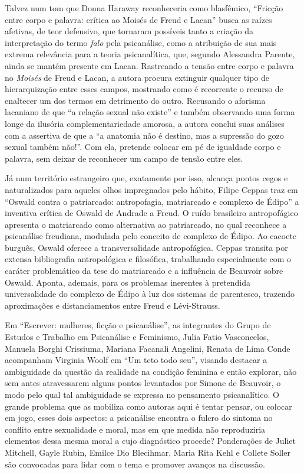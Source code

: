 Talvez num tom que Donna Haraway reconheceria como blasfêmico, ``Fricção
entre corpo e palavra: crítica ao Moisés de Freud e Lacan'' busca as
raízes afetivas, de teor defensivo, que tornaram possíveis tanto a
criação da interpretação do termo \emph{falo} pela psicanálise, como a
atribuição de sua mais extrema relevância para a teoria psicanalítica,
que, segundo Alessandra Parente, ainda se mantém presente em Lacan.
Rastreando a tensão entre corpo e palavra no \emph{Moisés} de Freud e
Lacan, a autora procura extinguir qualquer tipo de hierarquização entre
esses campos, mostrando como é recorrente o recurso de enaltecer um dos
termos em detrimento do outro. Recusando o aforisma lacaniano de que ``a
relação sexual não existe'' e também observando uma forma longe da
ilusória complementariedade amorosa, a autora conclui suas análises com
a assertiva de que a ``a anatomia não é destino, mas a supressão do gozo
sexual também não!''. Com ela, pretende colocar em pé de igualdade corpo
e palavra, sem deixar de reconhecer um campo de tensão entre eles.

Já num território estrangeiro que, exatamente por isso, alcança pontos
cegos e naturalizados para aqueles olhos impregnados pelo hábito, Filipe
Ceppas traz em ``Oswald contra o patriarcado: antropofagia, matriarcado
e complexo de Édipo'' a inventiva crítica de Oswald de Andrade a Freud.
O ruído brasileiro antropofágico apresenta o matriarcado como
alternativa ao patriarcado, no qual reconhece a psicanálise freudiana,
modulada pelo conceito de complexo de Édipo. Ao cacoete burguês, Oswald
oferece a transversalidade antropofágica. Ceppas transita por extensa
bibliografia antropológica e filosófica, trabalhando especialmente com o
caráter problemático da tese do matriarcado e a influência de Beauvoir
sobre Oswald. Aponta, ademais, para os problemas inerentes à pretendida
universalidade do complexo de Édipo à luz dos sistemas de parentesco,
trazendo aproximações e distanciamentos entre Freud e Lévi-Strauss.

Em ``Escrever: mulheres, ficção e psicanálise'', as integrantes do Grupo
de Estudos e Trabalho em Psicanálise e Feminismo, Julia Fatio
Vasconcelos, Manuela Borghi Crissiuma, Mariana Facanali Angelini, Renata
de Lima Conde acompanham Virginia Woolf em ``Um teto todo seu'', visando
destacar a ambiguidade da questão da realidade na condição feminina e
então explorar, não sem antes atravessarem alguns pontos levantados por
Simone de Beauvoir, o modo pelo qual tal ambiguidade se expressa no
pensamento psicanalítico. O grande problema que as mobiliza como autoras
aqui é tentar pensar, ou colocar em jogo, esses dois aspectos: a
psicanálise encontra o fulcro do sintoma no conflito entre sexualidade e
moral, mas em que medida não reproduziria elementos dessa mesma moral a
cujo diagnóstico procede? Ponderações de Juliet Mitchell, Gayle Rubin,
Emilce Dio Blecihmar, Maria Rita Kehl e Collete Soller são convocadas
para lidar com o tema e promover avanços na discussão.

